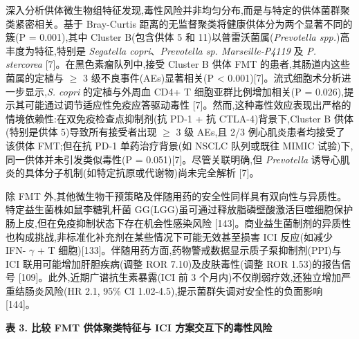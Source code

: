 深入分析供体微生物组特征发现,毒性风险并非均匀分布,而是与特定的供体菌群聚类紧密相关。基于 Bray-Curtis 距离的无监督聚类将健康供体分为两个显著不同的簇(P = 0.001),其中 Cluster B(包含供体 5 和 11)以普雷沃菌属(\emph{Prevotella spp.})高丰度为特征,特别是 \emph{Segatella copri}、\emph{Prevotella sp. Marseille-P4119} 及 \emph{P. stercorea} {[}7{]}。在黑色素瘤队列中,接受 Cluster B 供体 FMT 的患者,其肠道内这些菌属的定植与 \(\geq\) 3 级不良事件(AEs)显著相关(P \textless{} 0.001){[}7{]}。流式细胞术分析进一步显示,\emph{S. copri} 的定植与外周血 CD4+ T 细胞亚群比例增加相关(P = 0.026),提示其可能通过调节适应性免疫应答驱动毒性 {[}7{]}。然而,这种毒性效应表现出严格的情境依赖性:在双免疫检查点抑制剂(抗 PD-1 + 抗 CTLA-4)背景下,Cluster B 供体(特别是供体 5)导致所有接受者出现 \(\geq\) 3 级 AEs,且 2/3 例心肌炎患者均接受了该供体 FMT;但在抗 PD-1 单药治疗背景(如 NSCLC 队列或既往 MIMIC 试验)下,同一供体并未引发类似毒性(P = 0.051){[}7{]}。尽管关联明确,但 \emph{Prevotella} 诱导心肌炎的具体分子机制(如特定抗原或代谢物)尚未完全解析 {[}7{]}。

除 FMT 外,其他微生物干预策略及伴随用药的安全性同样具有双向性与异质性。特定益生菌株如鼠李糖乳杆菌 GG(LGG)虽可通过释放脂磷壁酸激活巨噬细胞保护肠上皮,但在免疫抑制状态下存在机会性感染风险 {[}143{]}。商业益生菌制剂的异质性也构成挑战,非标准化补充剂在某些情况下可能无效甚至损害 ICI 反应(如减少 IFN- \(\gamma\) + T 细胞){[}133{]}。伴随用药方面,药物警戒数据显示质子泵抑制剂(PPI)与 ICI 联用可能增加肝胆疾病(调整 ROR 7.10)及皮肤毒性(调整 ROR 1.53)的报告信号 {[}109{]}。此外,近期广谱抗生素暴露(ICI 前 3 个月内)不仅削弱疗效,还独立增加严重结肠炎风险(HR 2.1, 95\% CI 1.02-4.5),提示菌群失调对安全性的负面影响 {[}144{]}。

\textbf{表 3. 比较 FMT 供体聚类特征与 ICI 方案交互下的毒性风险}

